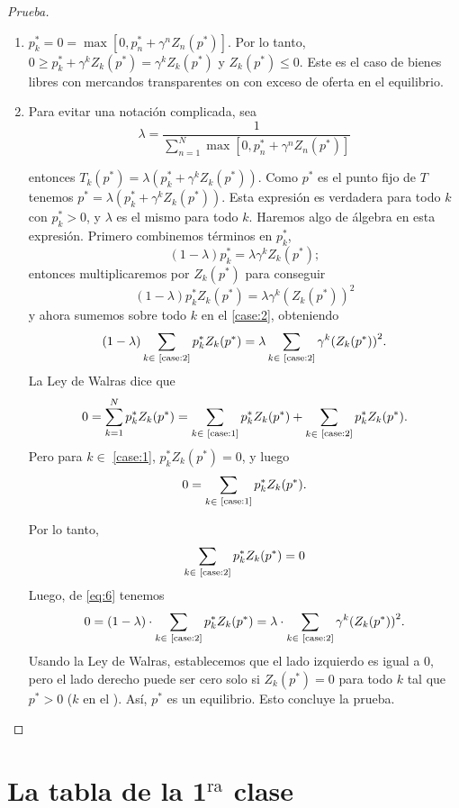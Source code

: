\documentclass[10pt,a4paper]{article}
\theoremstyle{definition}
\newcommand{\walrass}{Ley de Walras}
\newcommand{\mmax}[2]{\max\left[#1,#2\right]}
\newcommand{\pzp}[1]{\pp_{#1}Z_{#1}(\pp)}
\newcommand{\gzp}[2][]{\gamma^{#2}Z_{#2}(p^{#1})}
\newcommand{\pp}{p^{\ast}}
\begin{document}
\begin{proof}[Prueba]
\begin{enumerate}[label={\bfseries Caso~\arabic*},wide =\parindent]
\item $\pp_k=0=\mmax{0}{\pp_n+\gzp[\ast]{n}}$. Por lo tanto, $0\geq \pp_k+\gzp[\ast]{k}=\gzp[\ast]{k}$ y $Z_k(\pp)\leq0$. Este es el caso de bienes libres con mercandos transparentes on con exceso de oferta en el equilibrio.\label{case:1}
	
\item Para evitar una notación complicada, sea
\label{case:2}
$$
\lambda=\frac{1}{\sum\limits_{n=1}^N\mmax{0}{\pp_n+\gzp[\ast]{n}}}
$$

entonces $T_k(\pp)=\lambda(\pp_k+\gzp[\ast]{k})$. Como $\pp$ es el punto fijo de $T$ tenemos $\pp=\lambda\left(\pp_k+\gzp[\ast]{k}\right)$. Esta expresión es verdadera para todo $k$ con $\pp_k>0$, y $\lambda$ es el mismo para todo $k$. Haremos algo de álgebra en esta expresión. Primero combinemos términos en $\pp_k$,
$$
\left(1-\lambda\right)\pp_k=\lambda\gzp[\ast]{k};
$$
entonces multiplicaremos por $Z_k(\pp)$ para conseguir
\begin{equation}\label{eq:6}
\left(1-\lambda\right)\pp_kZ_k(\pp)=\lambda\gamma^{k}{\left(Z_k(p^{\ast})\right)}^{2}
\end{equation}
y ahora sumemos sobre todo $k$ en el \ref{case:2}, obteniendo
$$
(1-\lambda)\sum_{\substack{k\in\text{ \ref{case:2}}}}\pzp{k}=\lambda\sum_{\substack{k\in\text{ \ref{case:2}}}}\gamma^{k}{\left(Z_k(p^{\ast})\right)}^{2}.
$$
La \walrass{} dice que
$$
0=\sum_{k=1}^{N}\pzp{k}=\sum_{\substack{k\in\text{ \ref{case:1}}}}\pzp{k}+\sum_{\substack{k\in}\text{ \ref{case:2}}}\pzp{k}.
$$
Pero para $k\in$ \ref{case:1}, $\pp_kZ_k(\pp)=0$, y luego
$$
0=\sum_{\substack{k\in}\text{ \ref{case:1}}}\pzp{k}.
$$

Por lo tanto,
$$
\sum_{k\in\text{ \ref{case:2}}}\pzp{k}=0
$$
Luego, de \eqref{eq:6} tenemos
$$
0=\left(1-\lambda\right)\cdot\sum_{\substack{k\in\text{ \ref{case:2}}}}\pzp{k}=\lambda\cdot\sum_{\substack{k\in\text{ \ref{case:2}}}}\gamma^{k}{\left(Z_k(p^{\ast})\right)}^{2}.
$$
Usando la \walrass, establecemos que el lado izquierdo es igual a $0$, pero el lado derecho puede ser cero solo si $Z_k(\pp)=0$ para todo $k$ tal que $\pp>0$ ($k$ en el ). Así, $\pp$ es un equilibrio. Esto concluye la prueba.
\end{enumerate}
\end{proof}

\section[Una tabla]{La tabla de la 1$^{\text{ra}}$ clase}
\end{document}
